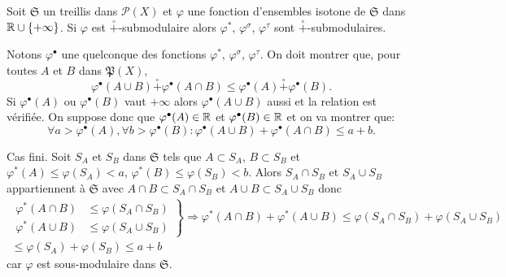 \begin{prop}
 Soit $\mathfrak{S}$ un treillis dans $\mathcal{P}(X)$ et $\varphi$ une fonction d'ensembles isotone de $\mathfrak{S}$ dans $\mathbb{R} \cup \left\lbrace +\infty \right\rbrace$.\newline
 Si $\varphi$ est $\overset{\circ}{+} $-submodulaire alors $\varphi^*$, $\varphi^\sigma$, $\varphi^\tau$ sont $\overset{\circ}{+} $-submodulaires.
\end{prop}
\begin{demo}
 Notons $\varphi^\bullet$ une quelconque des fonctions $\varphi^*$, $\varphi^\sigma$, $\varphi^\tau$. On doit montrer que, pour toutes $A$ et $B$ dans $\mathfrak{P}(X)$,
 \begin{displaymath}
  \varphi^\bullet(A \cup B) \overset{\circ}{+} \varphi^\bullet(A \cap B) \leq \varphi^\bullet(A) \overset{\circ}{+} \varphi^\bullet(B).
 \end{displaymath}
Si $\varphi^\bullet(A)$ ou $\varphi^\bullet(B)$ vaut $+\infty$ alors $\varphi^\bullet(A \cup B)$ aussi et la relation est vérifiée. On suppose donc que $\varphi^\bullet(A) \in \mathbb{R}$ et $\varphi^\bullet(B) \in \mathbb{R}$ et on va montrer que:
\begin{displaymath}
 \forall a > \varphi^\bullet(A), \forall b > \varphi^\bullet(B):
 \varphi^\bullet(A \cup B) + \varphi^\bullet(A \cap B) \leq a + b.
\end{displaymath}


Cas fini.\newline
Soit $S_A$ et $S_B$ dans $\mathfrak{S}$ tels que $A \subset S_A$, $B \subset S_B$ et $\varphi^*(A) \leq \varphi(S_A) < a$, $\varphi^*(B) \leq \varphi(S_B) < b$.
Alors $S_A \cap S_B$ et $S_A \cup S_B$ appartiennent à $\mathfrak{S}$ avec $A \cap B \subset S_A \cap S_B$ et $A \cup B \subset S_A \cup S_B$ donc
\begin{multline*}
 \left.
   \begin{aligned}
     \varphi^*(A \cap B) &\leq \varphi(S_A \cap S_B) \\
     \varphi^*(A \cup B) &\leq \varphi(S_A \cup S_B)
   \end{aligned}
  \right\rbrace
  \Rightarrow
  \varphi^*(A \cap B) + \varphi^*(A \cup B) \leq \varphi(S_A \cap S_B) + \varphi(S_A \cup S_B) \\
  \leq \varphi(S_A) + \varphi(S_B) \leq a + b
\end{multline*}
car $\varphi$ est sous-modulaire dans $\mathfrak{S}$.



\end{demo}
